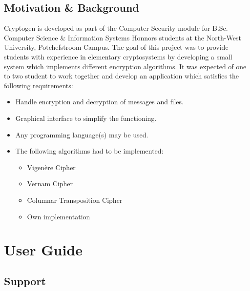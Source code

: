 \documentclass[11pt]{article}
\begin{document}
	\subsection{Motivation \& Background}
	Cryptogen is developed as part of the Computer Security module for B.Sc. Computer Science \& Information Systems Honnors students at the North-West University, Potchefstroom Campus. The goal of this project was to provide students with experience in elementary cryptosystems by developing a small
	system which implements different encryption algorithms. It was expected of one to two student to work together and develop an application which satisfies the following requirements:
	\begin{itemize}
		\item Handle encryption and decryption of messages and files.
		\item Graphical interface to simplify the functioning.
		\item Any programming language(s) may be used.
		\item The following algorithms had to be implemented:
		\begin{itemize}
			\item Vigen\`{e}re Cipher
			\item Vernam Cipher
			\item Columnar Transposition Cipher
			\item Own implementation
		\end{itemize}
	\end{itemize}

	\section{User Guide}
	\subsection{Support}
\end{document}
